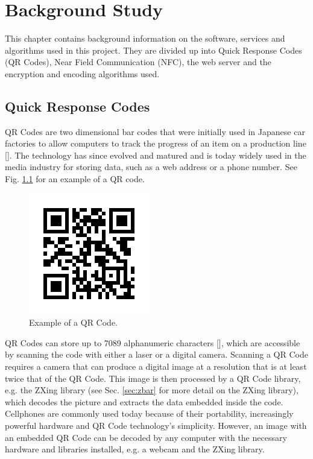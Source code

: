 \chapter{Background Study}
\label{chap:2}

This chapter contains background information on the software, services and algorithms used
in this project. They are divided up into Quick Response Codes (QR Codes), Near Field
Communication (NFC), the web server and the encryption and encoding algorithms used.

\section{Quick Response Codes}

QR Codes are two dimensional bar codes that were initially
 used in Japanese car factories to allow computers to track the progress of
 an item on a production line [\cite{journal:qr-code}]. The technology has
 since evolved and matured and is today widely used in the media industry for storing
 data, such as a web address or a phone number. See Fig. \ref{qrcode} for an example of
 a QR code.
 
\begin{figure}
\centering
\includegraphics[clip = true, trim = 0 20 0 20, scale = 0.4]{qrcode_voorbeeld.png}
\caption{Example of a QR Code.}
\label{qrcode}
\end{figure}
 
 QR Codes can store up to 7089 alphanumeric characters [\cite{journal:qr-code}], which are
 accessible by scanning the code with either a laser or a digital camera.
 Scanning a QR Code requires a camera that can produce a digital image at a
 resolution that is at least twice that of the QR Code.
 This image is then processed by a QR Code library, e.g.
 the ZXing library (see Sec. \ref{sec:zbar} for more detail on the ZXing library),
 which decodes the picture and extracts the data embedded inside the code. Cellphones are
 commonly used today because of their portability, increasingly powerful hardware and QR
 Code technology's simplicity.
 However, an image with an embedded QR Code can be decoded by any computer with the
 necessary hardware and libraries installed, e.g. a webcam and the ZXing
 library.

